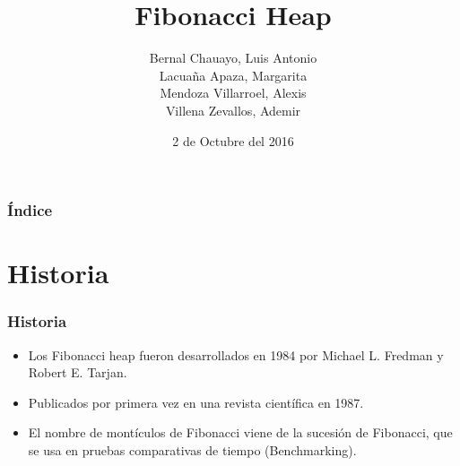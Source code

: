 \documentclass{beamer}
\title[Fibonacci Heap]{Fibonacci Heap}
\author[ALMA\and *Alexis\and Luis \and Margarita \and Ademir*]{{Bernal Chauayo, Luis Antonio}\\{Lacuaña Apaza, Margarita}\\{Mendoza Villarroel, Alexis}\\{Villena Zevallos, Ademir}}
\institute{{Ciencia de la Computación}
\\{Universidad Nacional de San Agustin}}
\date{2 de Octubre del 2016}
\begin{document}
\begin{frame}[plain]
    \titlepage
 \end{frame}
  
 \begin{frame}
  \frametitle{Índice}
  \begin{multicols}{2}
  \tableofcontents
  \end{multicols} 
\end{frame}

\section{Historia}
\begin{frame}
    \frametitle{Historia}
 \begin{itemize}
    \item Los Fibonacci heap  fueron desarrollados en 1984 por Michael L. Fredman y Robert E. Tarjan.
    \item Publicados por primera vez en una revista científica en 1987.
    \item El nombre de montículos de Fibonacci viene de la sucesión de Fibonacci, que se usa en pruebas comparativas de tiempo (Benchmarking).
\end{itemize}
\end{frame}
\end{document}
